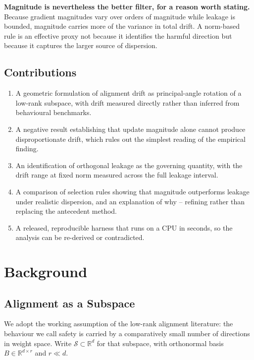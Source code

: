\documentclass[10pt,twocolumn,letterpaper]{article}
\begin{document}
\textbf{Magnitude is nevertheless the better filter, for a reason worth stating.} Because gradient magnitudes vary over orders of magnitude while leakage is bounded, magnitude carries more of the variance in total drift. A norm-based rule is an effective proxy not because it identifies the harmful direction but because it captures the larger source of dispersion.


\subsection{Contributions}


\begin{enumerate}
  \item A geometric formulation of alignment drift as principal-angle rotation of a low-rank subspace, with drift measured directly rather than inferred from behavioural benchmarks.
  \item A negative result establishing that update magnitude alone cannot produce disproportionate drift, which rules out the simplest reading of the empirical finding.
  \item An identification of orthogonal leakage as the governing quantity, with the drift range at fixed norm measured across the full leakage interval.
  \item A comparison of selection rules showing that magnitude outperforms leakage under realistic dispersion, and an explanation of why -- refining rather than replacing the antecedent method.
  \item A released, reproducible harness that runs on a CPU in seconds, so the analysis can be re-derived or contradicted.
\end{enumerate}




\section{Background}



\subsection{Alignment as a Subspace}


We adopt the working assumption of the low-rank alignment literature: the behaviour we call safety is carried by a comparatively small number of directions in weight space. Write $\mathcal{S} \subset \mathbb{R}^{d}$ for that subspace, with orthonormal basis $B \in \mathbb{R}^{d \times r}$ and $r \ll d$.
\end{document}
